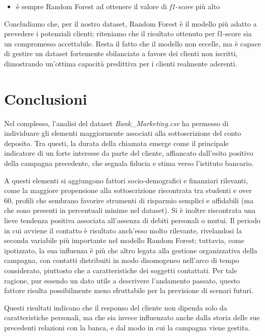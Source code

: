 \documentclass[11,5pt, a4paper]{article}
\begin{document}
\begin{itemize}
    \item è sempre Random Forest ad ottenere il valore di \textit{f1-score} più alto
\end{itemize}

Concludiamo che, per il nostro dataset, Random Forest è il modello più adatto a prevedere i potenziali clienti; riteniamo che il risultato ottenuto per f1-score sia un compromesso accettabile. Resta il fatto che il modello non eccelle, ma è capace di gestire un dataset fortemente sbilanciato a favore dei clienti non iscritti, dimostrando un'ottima capacità predittiva per i clienti realmente aderenti.


\section{Conclusioni}
 
Nel complesso, l'analisi del dataset \textit{Bank\_Marketing.csv} ha permesso di individuare gli elementi maggiormente associati alla sottoscrizione del conto deposito. Tra questi, la durata della chiamata emerge come il principale indicatore di un forte interesse da parte del cliente, affiancato dall'esito positivo della campagna precedente, che segnala fiducia e stima verso l'istituto bancario.

A questi elementi si aggiungono fattori socio-demografici e finanziari rilevanti, come la maggiore propensione alla sottoscrizione riscontrata tra studenti e over 60, profili che sembrano favorire strumenti di risparmio semplici e affidabili (ma che sono presenti in percentuali minime nel dataset). Si è inoltre riscontrata una lieve tendenza positiva associata all'assenza di debiti personali o mutui. Il periodo in cui avviene il contatto è risultato anch'esso molto rilevante, rivelandosi la seconda variabile più importante nel modello Random Forest; tuttavia, come ipotizzato, la sua influenza è più che altro legata alla gestione organizzativa della campagna, con contatti distribuiti in modo disomogeneo nell’arco di tempo considerato, piuttosto che a caratteristiche dei soggetti contattati. Per tale ragione, pur essendo un dato utile a descrivere l'andamento passato, questo fattore risulta possibilmente meno sfruttabile per la previsione di scenari futuri.

Questi risultati indicano che il responso del cliente non dipenda solo da caratteristiche personali, ma che sia invece influenzato anche dalla storia delle sue precedenti relazioni con la banca, e dal modo in cui la campagna viene gestita.
\end{document}
